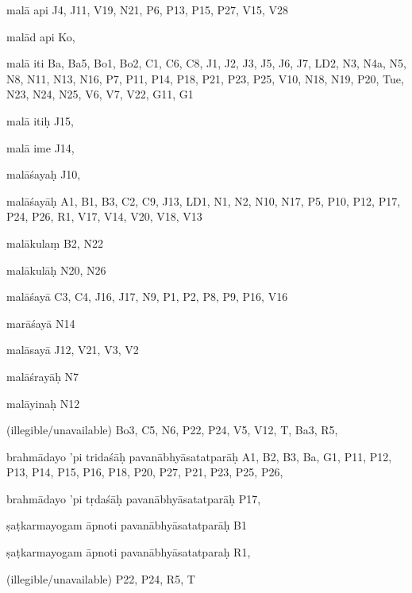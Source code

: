 \begin{ekdosis}
\begin{marma}[hp01_055]
\begin{marma}[hp02_009]
\begin{marma}[hp02_011]
\begin{marma}[hp02_38a]
\begin{description}
    \end{description}
 \end{marma}

 \begin{marma}[hp02_38b]
\item[malā api] J4, J11, V19, N21, P6, P13, P15, P27, V15, V28
\item[malād api] Ko,
\item[malā iti] Ba, Ba5, Bo1, Bo2, C1, C6, C8, J1, J2, J3, J5, J6, J7, LD2, N3, N4a, N5, N8, N11, N13, N16, P7, P11, P14, P18, P21, P23, P25, V10, N18, N19, P20, Tue, N23, N24, N25, V6, V7, V22, G11, G1
\item[malā itiḥ] J15,
\item[malā ime] J14, 
\item[malāśayaḥ] J10,
\item[malāśayāḥ] A1, B1, B3, C2, C9, J13, LD1, N1, N2, N10, N17, P5, P10, P12, P17, P24, P26, R1, V17, V14, V20, V18, V13
\item[malākulaṃ] B2, N22
\item[malākulāḥ] N20, N26
\item[malāśayā] C3, C4, J16, J17, N9, P1, P2, P8, P9, P16, V16
\item[marāśayā] N14
\item[malāsayā] J12, V21, V3, V2
\item[malāśrayāḥ] N7
\item[malāyinaḥ] N12
\item[(illegible/unavailable)] Bo3, C5, N6, P22, P24, V5, V12, T, Ba3, R5,
  \begin{description}

    \end{description}
 \end{marma}

 \begin{marma}[hp02_39ab]
\item[brahmādayo 'pi tridaśāḥ pavanābhyāsatatparāḥ] A1, B2, B3, Ba, G1, P11, P12, P13, P14, P15, P16, P18, P20, P27, P21, P23, P25, P26,
\item[brahmādayo 'pi tṛdaśāḥ pavanābhyāsatatparāḥ] P17,
\item[ṣaṭkarmayogam āpnoti pavanābhyāsatatparāḥ] B1
\item[ṣaṭkarmayogam āpnoti pavanābhyāsatatparaḥ] R1,
\item[(illegible/unavailable)] P22, P24, R5, T
  \begin{description}

    \end{description}
 \end{marma}


\end{marma}
\end{marma}
\end{marma}
\end{ekdosis}
